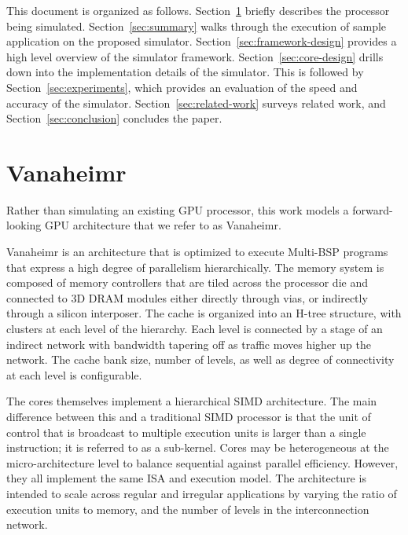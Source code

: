 \documentclass[conference, 10pt]{IEEEtran}
\begin{document}
This document is organized as follows.  
Section~\ref{sec:vanaheimr} briefly describes the processor being simulated.
Section~\ref{sec:summary} walks through the execution of sample application on
the proposed simulator.
Section~\ref{sec:framework-design} provides a high level overview of the 
simulator framework. 
Section~\ref{sec:core-design} drills down into the implementation details of 
the simulator.  
This is followed by Section~\ref{sec:experiments}, which provides an evaluation
of the speed and accuracy of the simulator.
Section~\ref{sec:related-work} surveys related work, and
Section~\ref{sec:conclusion} concludes the paper.


\section{Vanaheimr}
\label{sec:vanaheimr}

Rather than simulating an existing GPU processor, this work models a forward-looking
GPU architecture that we refer to as Vanaheimr.

Vanaheimr is an architecture that is optimized to execute Multi-BSP programs
that express a high degree of parallelism hierarchically.  The memory system
is composed of memory controllers that are tiled across the processor die
and connected to 3D DRAM modules either directly through vias, or
indirectly through a silicon interposer.  The cache is organized
into an H-tree structure, with clusters at each level of the hierarchy.  Each
level is connected by a stage of an indirect network with bandwidth tapering off
as traffic moves higher up the network.  The cache bank size,
number of levels, as well as degree of connectivity at each level is
configurable.  

The cores themselves implement a hierarchical SIMD architecture.
The main difference between this and a traditional SIMD processor is that the
unit of control that is broadcast to multiple execution units is larger than
a single instruction; it is referred to as a sub-kernel.  Cores may be
heterogeneous at the micro-architecture level to balance sequential against
parallel efficiency.  However, they all implement the same ISA and execution 
model. The architecture is intended to scale across regular and irregular 
applications by varying the ratio of execution units to memory, and the number 
of levels in the interconnection network.  
\end{document}
